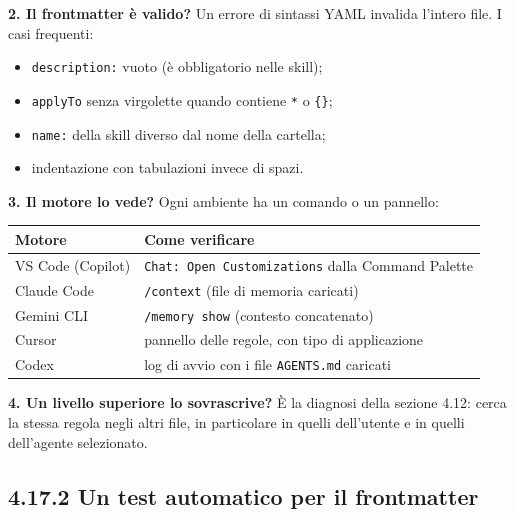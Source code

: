 \documentclass[
  italian,
  10pt,
]{book}
\newcounter{none} %
\providecommand{\tightlist}{%
  \setlength{\itemsep}{0pt}\setlength{\parskip}{0pt}}
\begin{document}
\textbf{2. Il frontmatter è valido?} Un errore di sintassi YAML invalida
l'intero file. I casi frequenti:

\begin{itemize}
\tightlist
\item
  \texttt{description:} vuoto (è obbligatorio nelle skill);
\item
  \texttt{applyTo} senza virgolette quando contiene \texttt{*} o
  \texttt{\{\}};
\item
  \texttt{name:} della skill diverso dal nome della cartella;
\item
  indentazione con tabulazioni invece di spazi.
\end{itemize}

\textbf{3. Il motore lo vede?} Ogni ambiente ha un comando o un
pannello:

{\def\LTcaptype{none} %
\begin{longtable}[]{@{}
  >{\raggedright\arraybackslash}p{}
  >{\raggedright\arraybackslash}p{}@{}}
\toprule\noalign{}
\begin{minipage}[b]{\linewidth}\raggedright
Motore
\end{minipage} & \begin{minipage}[b]{\linewidth}\raggedright
Come verificare
\end{minipage} \\
\midrule\noalign{}
\endhead
\bottomrule\noalign{}
\endlastfoot
VS Code (Copilot) & \texttt{Chat:\ Open\ Customizations} dalla Command
Palette \\
Claude Code & \texttt{/context} (file di memoria caricati) \\
Gemini CLI & \texttt{/memory\ show} (contesto concatenato) \\
Cursor & pannello delle regole, con tipo di applicazione \\
Codex & log di avvio con i file \texttt{AGENTS.md} caricati \\
\end{longtable}
}

\textbf{4. Un livello superiore lo sovrascrive?} È la diagnosi della
sezione 4.12: cerca la stessa regola negli altri file, in particolare in
quelli dell'utente e in quelli dell'agente selezionato.

\subsection{4.17.2 Un test automatico per il
frontmatter}\label{un-test-automatico-per-il-frontmatter}
\end{document}
